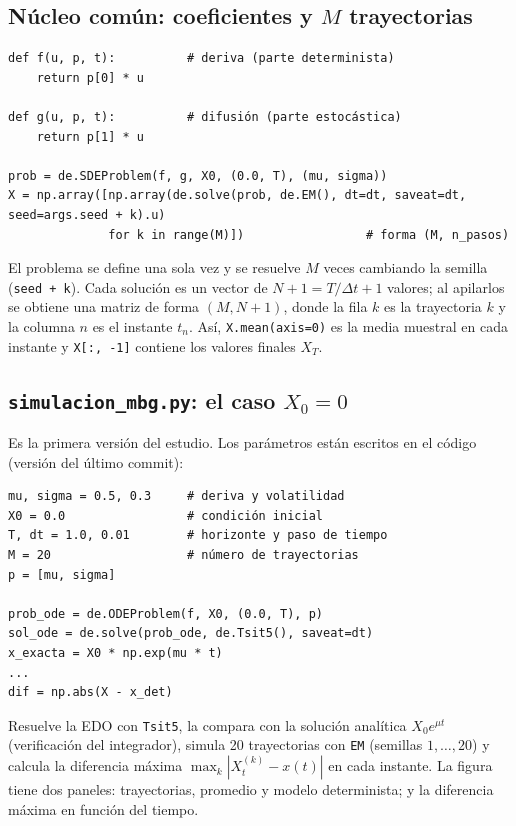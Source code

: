 \documentclass[11pt,a4paper]{article}
\begin{document}
\subsection{\texorpdfstring{Núcleo común: coeficientes y $M$ trayectorias}{Núcleo común: coeficientes y M trayectorias}}

\begin{lstlisting}
def f(u, p, t):          # deriva (parte determinista)
    return p[0] * u

def g(u, p, t):          # difusión (parte estocástica)
    return p[1] * u

prob = de.SDEProblem(f, g, X0, (0.0, T), (mu, sigma))
X = np.array([np.array(de.solve(prob, de.EM(), dt=dt, saveat=dt, seed=args.seed + k).u)
              for k in range(M)])                 # forma (M, n_pasos)
\end{lstlisting}

El problema se define una sola vez y se resuelve $M$ veces cambiando la semilla (\texttt{seed + k}). Cada solución es un vector de $N + 1 = T/\Delta t + 1$ valores; al apilarlos se obtiene una matriz de forma $(M, N+1)$, donde la fila $k$ es la trayectoria $k$ y la columna $n$ es el instante $t_n$. Así, \texttt{X.mean(axis=0)} es la media muestral en cada instante y \texttt{X[:, -1]} contiene los valores finales $X_T$.

\subsection{\texorpdfstring{\texttt{simulacion\_mbg.py}: el caso $X_0 = 0$}{simulacion\_mbg.py: el caso X0 = 0}}

Es la primera versión del estudio. Los parámetros están escritos en el código (versión del último commit):

\begin{lstlisting}
mu, sigma = 0.5, 0.3     # deriva y volatilidad
X0 = 0.0                 # condición inicial
T, dt = 1.0, 0.01        # horizonte y paso de tiempo
M = 20                   # número de trayectorias
p = [mu, sigma]

prob_ode = de.ODEProblem(f, X0, (0.0, T), p)
sol_ode = de.solve(prob_ode, de.Tsit5(), saveat=dt)
x_exacta = X0 * np.exp(mu * t)
...
dif = np.abs(X - x_det)
\end{lstlisting}

Resuelve la EDO con \texttt{Tsit5}, la compara con la solución analítica $X_0e^{\mu t}$ (verificación del integrador), simula 20 trayectorias con \texttt{EM} (semillas $1,\ldots,20$) y calcula la diferencia máxima $\max_k |X_t^{(k)} - x(t)|$ en cada instante. La figura tiene dos paneles: trayectorias, promedio y modelo determinista; y la diferencia máxima en función del tiempo.
\end{document}
